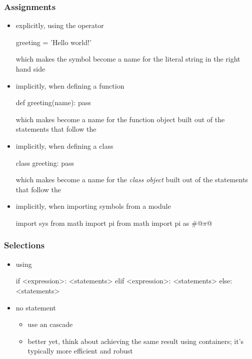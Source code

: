 \begin{frame}[fragile]
%
  \frametitle{Assignments}
%
  \begin{itemize}
%
  \item explicitly, using the \operator{=} operator
    \begin{ipython}{}
      greeting = 'Hello world!'
    \end{ipython}
    which makes the symbol  become a name for the literal string in the right
    hand side
%
  \item implicitly, when defining a function
    \begin{ipython}{}
      def greeting(name): pass
    \end{ipython}
    which makes  become a name for the function object built out of the
    statements that follow the \literal{:}
%
  \item implicitly, when defining a class
    \begin{ipython}{}
      class greeting: pass
    \end{ipython}
    which makes  become a name for the \emph{class object} built out of the
    statements that follow the \literal{:}
%
  \item implicitly, when importing symbols from a module
    \begin{ipython}{}
      import sys
      from math import pi
      from math import pi as #@$\pi$@ 
    \end{ipython}
%
  \end{itemize}
%
\end{frame}

\begin{frame}[fragile]
%
  \frametitle{Selections}
%
  \begin{itemize}
%
  \item using 
    \begin{ipython}{}
      if <expression>:
          <statements>
      elif <expression>:
          <statements>
      else:
          <statements>
    \end{ipython}
%
  \item no  statement
    \begin{itemize}
    \item use an  cascade
    \item better yet, think about achieving the same result using containers; it's typically
      more efficient and robust
    \end{itemize}
%
  \end{itemize}
%
\end{frame}

